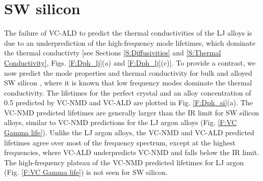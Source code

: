 \documentclass[aps,prb,onecolumn,preprint,footinbib,superscriptaddress,amsmath,amssymb,floatfix]{revtex4}
\begin{document}

\clearpage

\section{\label{S:SW}SW silicon}

The failure of VC-ALD to predict the thermal conductivities of the LJ 
alloys is due to an underprediction of the high-frequency mode lifetimes, 
which dominate the thermal conductivty 
[see Sections \ref{S:Diffusivities} and \ref{S:Thermal Conductivity}, 
Figs. \ref{F:Dph_lj}(a) and \ref{F:Dph_lj}(c)]. To provide a contrast, 
we now predict the mode properties and thermal conductivity for bulk 
and alloyed SW silicon , where it is known that low frequency modes 
dominate the thermal conductivity.
\cite{sellan_size_2010,sellan_cross-plane_2010} 
The lifetimes for the perfect crystal and an alloy concentration of 
0.5 predicted by VC-NMD and VC-ALD are plotted in Fig. \ref{F:Dph_si}(a). 
The VC-NMD predicted lifetimes are generally larger than 
the IR limit for SW silicon alloys, similar 
to VC-NMD predictions for the LJ argon alloys 
(Fig. \ref{F:VC Gamma life}). Unlike the 
LJ argon alloys, the  
VC-NMD and VC-ALD predicted lifetimes agree over most 
of the frequency spectrum, except at the highest frequencies, where 
VC-ALD underpredicts VC-NMD and falls below the IR limit. 
The high-frequency plateau of the VC-NMD predicted lifetimes 
for LJ argon (Fig. \ref{F:VC Gamma life}) is not seen for SW silicon.
\end{document}
